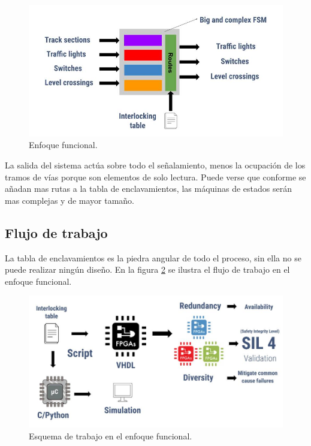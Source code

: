 			\begin{figure}[h!]
			\centering
				\includegraphics[scale=.55]{./Figures/Funcional}
				\caption{Enfoque funcional.}
				\label{fig:Modelo_Funcional}
			\end{figure}
		
		\vspace{5cm}
			
		La salida del sistema actúa sobre todo el señalamiento, menos la ocupación de los tramos de vías porque son elementos de solo lectura. Puede verse que conforme se añadan mas rutas a la tabla de enclavamientos, las máquinas de estados serán mas complejas y de mayor tamaño.
	
	\subsection{Flujo de trabajo}
		
		La tabla de enclavamientos es la piedra angular de todo el proceso, sin ella no se puede realizar ningún diseño. En la figura \ref{fig:Work_Funcional} se ilustra el flujo de trabajo en el enfoque funcional.		
			
		\begin{figure}[h]
		\centering
			\includegraphics[scale=.4]{./Figures/Funcional_workflow}
			\caption{Esquema de trabajo en el enfoque funcional.}
			\label{fig:Work_Funcional}
		\end{figure}
	
